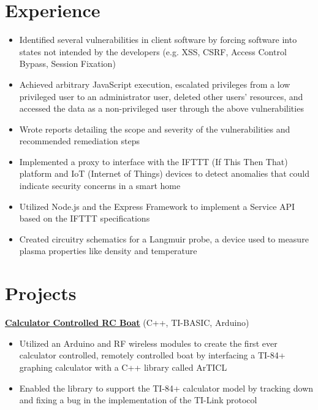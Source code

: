 \documentclass{article}
\begin{document}
\section{Experience}
\begin{itemize}
    \item Identified several vulnerabilities in client software by forcing software into states not intended by the developers (e.g. XSS, CSRF, Access Control Bypass, Session Fixation)
    \item Achieved arbitrary JavaScript execution, escalated privileges from a low privileged user to an administrator user, deleted other users' resources, and accessed the data as a non-privileged user through the above vulnerabilities
    \item Wrote reports detailing the scope and severity of the vulnerabilities and recommended remediation steps

\end{itemize}
\begin{itemize}
    \item Implemented a proxy to interface with the IFTTT (If This Then That) platform and IoT (Internet of Things) devices to detect anomalies that could indicate security concerns in a smart home
    \item Utilized Node.js and the Express Framework to implement a Service API based on the IFTTT specifications
\end{itemize}
\begin{itemize}
    \item Created circuitry schematics for a Langmuir probe, a device used to measure plasma properties like density and temperature
\end{itemize}

\section{Projects}

\textbf{\href{https://github.com/jshin313/CalcControlledBoat}{\underline{Calculator Controlled RC Boat}}} \hfill (C++, TI-BASIC, Arduino)
\begin{itemize}
    \item Utilized an Arduino and RF wireless modules to create the first ever calculator controlled, remotely controlled boat by interfacing a TI-84+ graphing calculator with a C++ library called ArTICL
    \item Enabled the library to support the TI-84+ calculator model by tracking down and fixing a bug in the implementation of the TI-Link protocol
\end{itemize}
\end{document}
